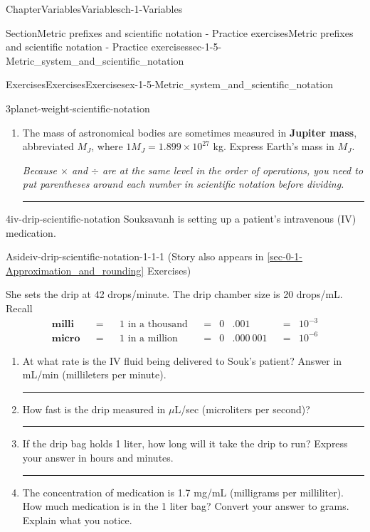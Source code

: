 \documentclass[twoside,11pt,]{book}
\newcommand{\xreffont}{\relax}
\newcommand{\terminology}[1]{\textbf{#1}}
\newlength{\workspacestrutwidth}
\numberwithin{equation}{section}
\newcommand{\amp}{&}
\begin{document}
\begin{chapterptx}{Chapter}{Variables}{}{Variables}{}{}{ch-1-Variables}
\begin{sectionptx}{Section}{Metric prefixes and scientific notation - Practice exercises}{}{Metric prefixes and scientific notation - Practice exercises}{}{}{sec-1-5-Metric_system_and_scientific_notation}
\begin{exercises-subsection-numberless}{Exercises}{Exercises}{}{Exercises}{}{}{ex-1-5-Metric_system_and_scientific_notation}
\begin{divisionexercise}{3}{}{}{planet-weight-scientific-notation}
\begin{enumerate}[label=(\alph*),ref=\alph*]
\item{}The mass of astronomical bodies are sometimes measured in \terminology{Jupiter mass}, abbreviated \(M_J\), where \(1 M_J = 1.899 \times 10^{27}\) kg. Express Earth's mass in \(M_J\).%
\par
\emph{Because \(\times\) and \(\div\) are at the same level in the order of operations, you need to put parentheses around each number in scientific notation before dividing.}%
\par\rule{\workspacestrutwidth}{1.25in}%
\end{enumerate}%
\end{divisionexercise}%
\clearpage
\begin{divisionexercise}{4}{}{}{iv-drip-scientific-notation}%
Souksavanh is setting up a patient's intravenous (IV) medication. \begin{aside}{Aside}{}{iv-drip-scientific-notation-1-1-1}%
(Story also appears in \hyperref[sec-0-1-Approximation_and_rounding]{{\xreffont\ref{sec-0-1-Approximation_and_rounding}}} Exercises)%
\end{aside}
 She sets the drip at 42 drops\slash{}minute. The drip chamber size is 20 drops\slash{}mL. Recall%
\begin{align*}
\amp\textbf{milli} \amp
\amp= \amp 
\amp 1 \text{ in a thousand} \amp
\amp =\amp
0\amp.001\amp
\amp=\amp
10^{-3}\amp\\
\amp\textbf{micro} \amp
\amp= \amp 
\amp 1 \text{ in a million} \amp
\amp =\amp
0\amp.000~001\amp
\amp=\amp
10^{-6}\amp
\end{align*}
%
\begin{enumerate}[label=(\alph*),ref=\alph*]%
\item{}At what rate is the IV fluid being delivered to Souk's patient? Answer in mL\slash{}min (millileters per minute).%
\par\rule{\workspacestrutwidth}{2.25cm}%
\item{}How fast is the drip measured in \(\mu\)L\slash{}sec (microliters per second)?%
\par\rule{\workspacestrutwidth}{2.25cm}%
\item{}If the drip bag holds 1 liter, how long will it take the drip to run? Express your answer in hours and minutes.%
\par\rule{\workspacestrutwidth}{2.25cm}%
\item{}The concentration of medication is 1.7 mg\slash{}mL (milligrams per milliliter). How much medication is in the 1 liter bag? Convert your answer to grams. Explain what you notice.%

\end{enumerate}
\end{divisionexercise}
\end{exercises-subsection-numberless}
\end{sectionptx}
\end{chapterptx}
\end{document}
